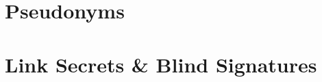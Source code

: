\documentclass[
	english,%
	authorontitle=true,
	]{bfhbeamer}
\begin{document}
\section{Pseudonyms}

\section{Link Secrets \& Blind Signatures}
\end{document}
